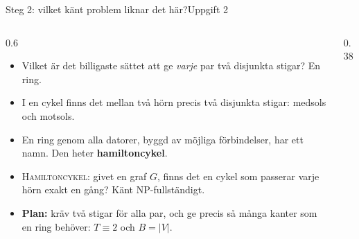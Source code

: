 \documentclass[aspectratio=169,10pt]{beamer}
\newcommand{\prob}[1]{\textsc{#1}}
\begin{document}
\begin{frame}{Steg 2: vilket känt problem liknar det här?}{Uppgift 2}
  \begin{columns}[T]
    \begin{column}{0.6\textwidth}
      \begin{itemize}
        \item<1-> Vilket är det billigaste sättet att ge \emph{varje} par två disjunkta stigar? En ring.
        \item<2-> I en cykel finns det mellan två hörn precis två disjunkta stigar: medsols och motsols.
        \item<3-> En ring genom alla datorer, byggd av möjliga förbindelser, har ett namn. Den heter \textbf{hamiltoncykel}.
        \item<4-> \prob{Hamiltoncykel}: givet en graf $G$, finns det en cykel som passerar varje hörn exakt en gång? Känt NP-fullständigt.
        \item<5-> \textbf{Plan:} kräv två stigar för alla par, och ge precis så många kanter som en ring behöver: $T\equiv 2$ och $B=|V|$.
      \end{itemize}
    \end{column}
    \begin{column}{0.38\textwidth}
      \centering
    \end{column}
  \end{columns}
\end{frame}
\end{document}

